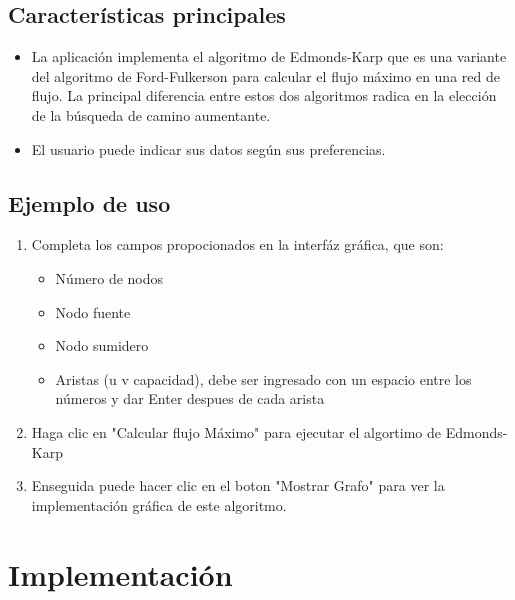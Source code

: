 \documentclass[a4paper]{article}
\begin{document}
\subsection{Características principales}
\begin{itemize}
    \item La aplicación implementa el algoritmo de Edmonds-Karp que es una variante del algoritmo de Ford-Fulkerson para calcular el flujo máximo en una red de flujo. La principal diferencia entre estos dos algoritmos radica en la elección de la búsqueda de camino aumentante.
    \item El usuario puede indicar sus datos según sus preferencias.
\end{itemize}

\subsection{Ejemplo de uso}
\begin{enumerate}
    \item Completa los campos propocionados en la interfáz gráfica, que son:
    \begin{itemize}
        \item Número de nodos 
        \item Nodo fuente 
        \item Nodo sumidero 
        \item Aristas (u v capacidad), debe ser ingresado con un espacio entre los números y dar Enter despues de cada arista 
    \end{itemize}
    \item Haga clic en "Calcular flujo Máximo" para ejecutar el algortimo de Edmonds-Karp
    \item Enseguida puede hacer clic en el boton "Mostrar Grafo" para ver la implementación gráfica de este algoritmo.
\end{enumerate}

\section{Implementación}
\end{document}
